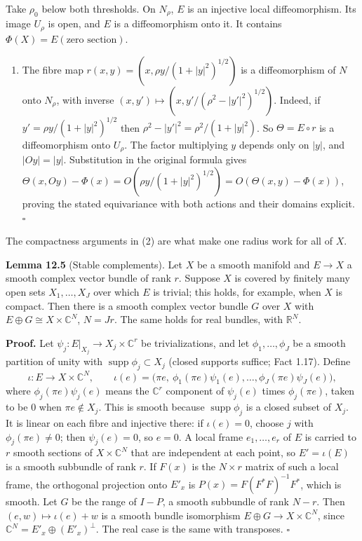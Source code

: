 \documentclass[
  11pt,
]{article}
\providecommand{\tightlist}{%
  \setlength{\itemsep}{0pt}\setlength{\parskip}{0pt}}
\begin{document}
Take \(\rho_0\) below both thresholds. On \(N_\rho\), \(E\) is an
injective local diffeomorphism. Its image \(U_\rho\) is open, and \(E\)
is a diffeomorphism onto it. It contains
\(\Phi(X)=E(\text{zero section})\).

\begin{enumerate}
\def\labelenumi{(\arabic{enumi})}
\setcounter{enumi}{2}
\tightlist
\item
  The fibre map \(r(x,y)=(x,\rho y/(1+|y|^2)^{1/2})\) is a
  diffeomorphism of \(N\) onto \(N_\rho\), with inverse
  \((x,y')\mapsto(x,y'/(\rho^2-|y'|^2)^{1/2})\). Indeed, if
  \(y'=\rho y/(1+|y|^2)^{1/2}\) then \(\rho^2-|y'|^2=\rho^2/(1+|y|^2)\).
  So \(\Theta=E\circ r\) is a diffeomorphism onto \(U_\rho\). The factor
  multiplying \(y\) depends only on \(|y|\), and \(|Oy|=|y|\).
  Substitution in the original formula gives
  \(\Theta(x,Oy)-\Phi(x)=O(\rho y/(1+|y|^2)^{1/2})=O(\Theta(x,y)-\Phi(x))\),
  proving the stated equivariance with both actions and their domains
  explicit. \(\square\)
\end{enumerate}

The compactness arguments in (2) are what make one radius work for all
of \(X\).

\textbf{Lemma 12.5} (Stable complements). Let \(X\) be a smooth manifold
and \(E\to X\) a smooth complex vector bundle of rank \(r\). Suppose
\(X\) is covered by finitely many open sets \(X_1,\dots,X_J\) over which
\(E\) is trivial; this holds, for example, when \(X\) is compact. Then
there is a smooth complex vector bundle \(G\) over \(X\) with
\(E\oplus G\cong X\times\mathbb C^N\), \(N=Jr\). The same holds for real
bundles, with \(\mathbb R^N\).

\textbf{Proof.} Let \(\psi_j:E|_{X_j}\to X_j\times\mathbb C^r\) be
trivializations, and let \(\phi_1,\dots,\phi_J\) be a smooth partition
of unity with \(\operatorname{supp}\phi_j\subset X_j\) (closed supports
suffice; Fact 1.17). Define \[
\iota:E\to X\times\mathbb C^{N},\qquad \iota(e)=\bigl(\pi e,\ \phi_1(\pi e)\psi_1(e),\dots,\phi_J(\pi e)\psi_J(e)\bigr),
\] where \(\phi_j(\pi e)\psi_j(e)\) means the \(\mathbb C^r\) component
of \(\psi_j(e)\) times \(\phi_j(\pi e)\), taken to be \(0\) when
\(\pi e\notin X_j\). This is smooth because
\(\operatorname{supp}\phi_j\) is a closed subset of \(X_j\). It is
linear on each fibre and injective there: if \(\iota(e)=0\), choose
\(j\) with \(\phi_j(\pi e)\ne0\); then \(\psi_j(e)=0\), so \(e=0\). A
local frame \(e_1,\dots,e_r\) of \(E\) is carried to \(r\) smooth
sections of \(X\times\mathbb C^N\) that are independent at each point,
so \(E'=\iota(E)\) is a smooth subbundle of rank \(r\). If \(F(x)\) is
the \(N\times r\) matrix of such a local frame, the orthogonal
projection onto \(E'_x\) is \(P(x)=F(F^*F)^{-1}F^*\), which is smooth.
Let \(G\) be the range of \(I-P\), a smooth subbundle of rank \(N-r\).
Then \((e,w)\mapsto\iota(e)+w\) is a smooth bundle isomorphism
\(E\oplus G\to X\times\mathbb C^N\), since
\(\mathbb C^N=E'_x\oplus(E'_x)^\perp\). The real case is the same with
transposes. \(\square\)
\end{document}
